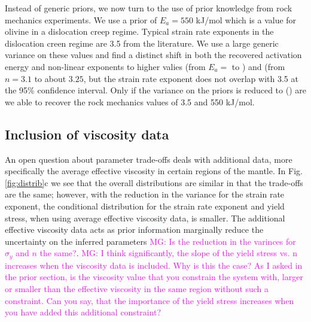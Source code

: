 \documentclass[12pt]{article}
\newcommand{\mgnote}[1]{\textcolor{magenta}{MG: #1}}
\begin{document}
{Instead of generic priors,
we now turn to the use of prior knowledge
from rock mechanics experiments.
We use a prior of $E_a=550$ kJ/mol which is a value for olivine in a
dislocation creep regime.
Typical strain rate exponents in the dislocation creen regime are 3.5 from the
literature.
We use a large generic variance on these values and
find a distinct shift in both the recovered activation energy and non-linear
exponents to higher valies (from $E_a=$ to ) and (from $n=3.1$ to about $3.25$, but the strain rate  exponent does not overlap with 3.5 at the 95\% confidence interval. Only if the variance on the priors is reduced to () are we able to recover the rock mechanics values of 3.5 and 550 kJ/mol.

\subsection{Inclusion of viscosity data}

An open question about parameter trade-offs deals with additional data, more specifically the average effective viscosity in certain regions of the mantle. 
In Fig.\ref{fig:distrib}c we see that the overall distributions are similar in that the trade-offs are the same; however, with the reduction in the variance for the strain rate exponent, the conditional distribution for the strain rate exponent and yield stress, when using average effective viscosity data, is smaller. The additional effective viscosity data acts as prior information marginally reduce the uncertainty on the inferred parameters \mgnote{Is the reduction in the varinces for $\sigma_y$ and $n$ the same?}. 
\mgnote{I think significantly, the slope of the yield stress vs. n increases when the viscosity data is included. Why is this the case? As I asked in the prior section, is the viscosity value that you constrain the system with, larger or smaller than the effective viscosity in the same region without such a constraint. Can you say, that the importance of the yield stress increases when you have added this additional constraint?}

}
\end{document}
